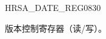 \begin{register}{H}{RSA\_DATE\_REG}{\hexprefix{}0830}\label{regdesc:RSADATEREG}
%
%
\regnewline%
\begin{regdesc}\begin{reglist}
\item [RSA\_DATE] 版本控制寄存器（读/写）。
\end{reglist}\end{regdesc}
\end{register}